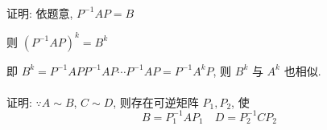      \paragraph{} %
         证明: 依题意, \( P^{-1}AP = B \)

         则 \( (P^{-1}AP)^{k} = B^{k} \)

         即 \( B^{k} = P^{-1}APP^{-1}AP\cdots P^{-1}AP = P^{-1}A^{k}P \), 则 \( B^{k} \) 与 \( A^{k} \) 也相似.


     \paragraph{} %
         证明: \( \because A \sim B \), \( C \sim D \), 则存在可逆矩阵 \( P_{1}, P_{2} \), 使
         \[ B = P_{1}^{-1}AP_{1} \quad D = P_{2}^{-1}CP_{2} \]

